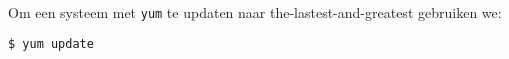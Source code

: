 Om een systeem met \texttt{yum} te updaten naar the-lastest-and-greatest gebruiken we:
\begin{lstlisting}[language=bash]
$ yum update
\end{lstlisting}

